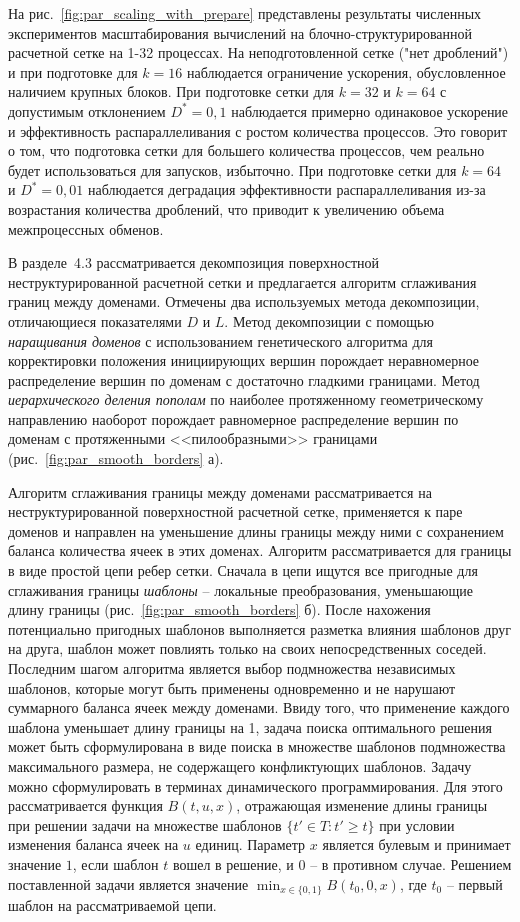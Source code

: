 \documentclass[a4paper,14pt]{extarticle}                     %
\theoremstyle{plain}                                         %
\begin{document}
На рис.~\ref{fig:par_scaling_with_prepare} представлены результаты численных экспериментов масштабирования вычислений на блочно-структурированной расчетной сетке на 1-32 процессах.
На неподготовленной сетке ("нет дроблений") и при подготовке для $k = 16$ наблюдается ограничение ускорения, обусловленное наличием крупных блоков. 
При подготовке сетки для $k = 32$ и $k = 64$ с допустимым отклонением $D^{*} = 0{,}1$ наблюдается примерно одинаковое ускорение и эффективность распараллеливания с ростом количества процессов.
Это говорит о том, что подготовка сетки для большего количества процессов, чем реально будет использоваться для запусков, избыточно.
При подготовке сетки для $k = 64$ и $D^{*} = 0{,}01$ наблюдается деградация эффективности распараллеливания из-за возрастания количества дроблений, что приводит к увеличению объема межпроцессных обменов.


В разделе~4.3 рассматривается декомпозиция поверхностной неструктурированной расчетной сетки и предлагается алгоритм сглаживания границ между доменами.
Отмечены два используемых метода декомпозиции, отличающиеся показателями $D$ и $L$.
Метод декомпозиции с помощью \textit{наращивания доменов} с использованием генетического алгоритма для корректировки положения инициирующих вершин порождает неравномерное распределение вершин по доменам с достаточно гладкими границами.
Метод \textit{иерархического деления пополам} по наиболее протяженному геометрическому направлению наоборот порождает равномерное распределение вершин по доменам с протяженными <<пилообразными>> границами (рис.~\ref{fig:par_smooth_borders} а).

Алгоритм сглаживания границы между доменами рассматривается на неструктурированной поверхностной расчетной сетке, применяется к паре доменов и направлен на уменьшение длины границы между ними с сохранением баланса количества ячеек в этих доменах.
Алгоритм рассматривается для границы в виде простой цепи ребер сетки.
Сначала в цепи ищутся все пригодные для сглаживания границы \textit{шаблоны} -- локальные преобразования, уменьшающие длину границы (рис.~\ref{fig:par_smooth_borders} б).
После нахожения потенциально пригодных шаблонов выполняется разметка влияния шаблонов друг на друга, шаблон может повлиять только на своих непосредственных соседей.
Последним шагом алгоритма является выбор подмножества независимых шаблонов, которые могут быть применены одновременно и не нарушают суммарного баланса ячеек между доменами.
Ввиду того, что применение каждого шаблона уменьшает длину границы на 1, задача поиска оптимального решения может быть сформулирована в виде поиска в множестве шаблонов подмножества максимального размера, не содержащего конфликтующих шаблонов.
Задачу можно сформулировать в терминах динамического программирования.
Для этого рассматривается функция $B(t, u, x)$, отражающая изменение длины границы при решении задачи на множестве шаблонов $\{ t' \in T : t' \ge t \}$ при условии изменения баланса ячеек на $u$ единиц.
Параметр $x$ является булевым и принимает значение $1$, если шаблон $t$ вошел в решение, и $0$ -- в противном случае.
Решением поставленной задачи является значение $\min_{x \in \{0, 1\}}{B(t_0, 0, x)}$, где $t_0$ -- первый шаблон на рассматриваемой цепи.
\end{document}
